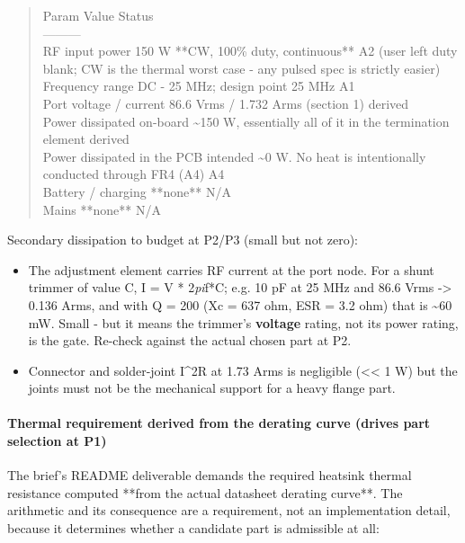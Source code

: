 \documentclass[11pt,a4paper]{article}
\begin{document}
\begin{quote}\small\ttfamily\raggedright
\textbar{} Param \textbar{} Value \textbar{} Status \textbar{}\\
\textbar{}---\textbar{}---\textbar{}---\textbar{}\\
\textbar{} RF input power \textbar{} 150 W {*}{*}CW, 100\% duty, continuous{*}{*} \textbar{} A2 (user left duty blank; CW is the thermal worst case - any pulsed spec is strictly easier) \textbar{}\\
\textbar{} Frequency range \textbar{} DC - 25 MHz; design point 25 MHz \textbar{} A1 \textbar{}\\
\textbar{} Port voltage / current \textbar{} 86.6 Vrms / 1.732 Arms (section 1) \textbar{} derived \textbar{}\\
\textbar{} Power dissipated on-board \textbar{} \textasciitilde{}150 W, essentially all of it in the termination element \textbar{} derived \textbar{}\\
\textbar{} Power dissipated in the PCB \textbar{} intended \textasciitilde{}0 W. No heat is intentionally conducted through FR4 (A4) \textbar{} A4 \textbar{}\\
\textbar{} Battery / charging \textbar{} {*}{*}none{*}{*} \textbar{} N/A \textbar{}\\
\textbar{} Mains \textbar{} {*}{*}none{*}{*} \textbar{} N/A \textbar{}
\end{quote}
Secondary dissipation to budget at P2/P3 (small but not zero):

\begin{itemize}
\item The adjustment element carries RF current at the port node. For a shunt trimmer of value C,
I = V {*} 2\emph{pi}f{*}C; e.g. 10 pF at 25 MHz and 86.6 Vrms -\textgreater{} 0.136 Arms, and with Q = 200
(Xc = 637 ohm, ESR = 3.2 ohm) that is \textasciitilde{}60 mW. Small - but it means the trimmer's \textbf{voltage}
rating, not its power rating, is the gate. Re-check against the actual chosen part at P2.
\item Connector and solder-joint I\textasciicircum{}2R at 1.73 Arms is negligible (\textless{}\textless{} 1 W) but the joints must not be
the mechanical support for a heavy flange part.
\end{itemize}
\paragraph*{Thermal requirement derived from the derating curve (drives part selection at P1)}
The brief's README deliverable demands the required heatsink thermal resistance computed {*}{*}from the actual datasheet derating curve{*}{*}. The arithmetic and its consequence are a requirement, not an implementation detail, because it determines whether a candidate part is admissible at all:
\end{document}
